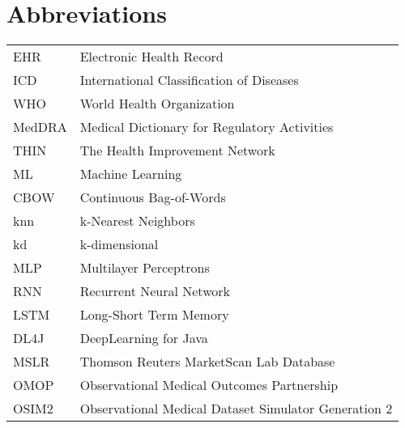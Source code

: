 \documentclass[master=ecws,masteroption=ai]{kulemt}
\begin{document}
\section*{Abbreviations}
\begin{flushleft}
  \renewcommand{\arraystretch}{1.1}
  \begin{tabularx}{\textwidth}{@{}p{12mm}X@{}}
    EHR   & Electronic Health Record \\
    ICD   & International Classification of Diseases \\
    WHO  & World Health Organization \\
    MedDRA & Medical Dictionary for Regulatory Activities \\
    THIN & The Health Improvement Network \\
    ML & Machine Learning \\
    CBOW & Continuous Bag-of-Words \\
    knn & k-Nearest Neighbors \\
    kd & k-dimensional \\
    MLP & Multilayer Perceptrons \\
    RNN & Recurrent Neural Network \\
    LSTM & Long-Short Term Memory \\
    DL4J & DeepLearning for Java \\
    MSLR & Thomson Reuters MarketScan Lab Database \\
    OMOP & Observational Medical Outcomes Partnership \\
    OSIM2 & Observational Medical Dataset Simulator Generation 2 \\
  \end{tabularx}
\end{flushleft}


\mainmatter

%






%
%


\backmatter
\nocite{*}


\end{document}
